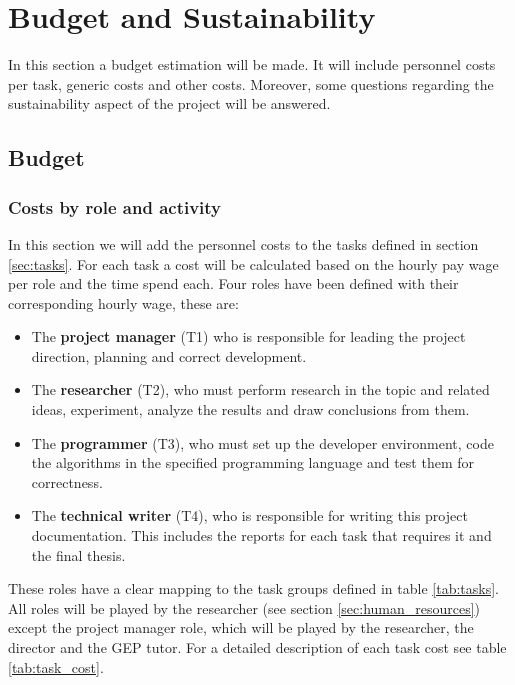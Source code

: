 
\chapter{Budget and Sustainability} %
\label{Chapter3}

In this section a budget estimation will be made. It will include personnel costs per task, generic costs and other costs. Moreover, some questions regarding the sustainability aspect of the project will be answered.

\section{Budget}
\label{sec:budget}

\subsection{Costs by role and activity}

In this section we will add the personnel costs to the tasks defined in section \ref{sec:tasks}. For each task a cost will be calculated based on the hourly pay wage per role and the time spend each. Four roles have been defined with their corresponding hourly wage, these are:

\begin{itemize}
    \item The \textbf{project manager} (T1) who is responsible for leading the project direction, planning and correct development.
    \item The \textbf{researcher} (T2), who must perform research in the topic and related ideas, experiment, analyze the results and draw conclusions from them.
    \item The \textbf{programmer} (T3), who must set up the developer environment, code the algorithms in the specified programming language and test them for cor\-rect\-ness.
    \item The \textbf{technical writer} (T4), who is responsible for writing this project doc\-u\-men\-ta\-tion. This includes the reports for each task that requires it and the final thesis.
\end{itemize}

These roles have a clear mapping to the task groups defined in table \ref{tab:tasks}. All roles will be played by the researcher (see section \ref{sec:human_resources}) except the project manager role, which will be played by the researcher, the director and the GEP tutor. For a detailed description of each task cost see table \ref{tab:task_cost}.

